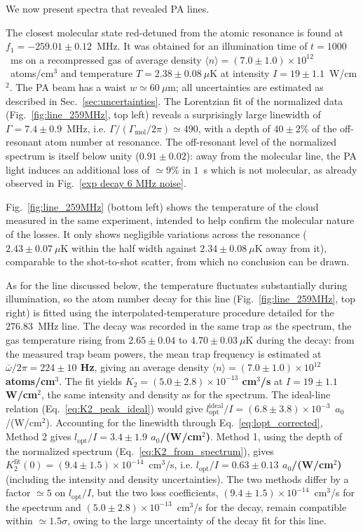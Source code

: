 We now present spectra that revealed PA lines.

The closest molecular state red-detuned from the atomic resonance is found at
$f_1 = -259.01 \pm 0.12$~MHz. It was obtained for an illumination time of
$t=1000$~ms on a recompressed gas of average density
$\langle n\rangle = (7.0\pm1.0)\times10^{12}$~atoms/cm$^3$ and temperature $T=2.38\pm0.08~\mu$K at intensity
$I=19\pm1.1$~W/cm$^2$. The PA beam has a waist $w\simeq60~\mu$m; all uncertainties are estimated as described in
Sec.~\ref{sec:uncertainties}. The
Lorentzian fit of the normalized data (Fig.~\ref{fig:line_259MHz}, top left) reveals a
surprisingly large linewidth of $\Gamma = 7.4\pm0.9$~MHz, i.e.
$\Gamma/(\Gamma_{\text{mol}}/2\pi) \simeq 490$, with a depth of
$40\pm2\%$ of the off-resonant atom number at resonance. The off-resonant level of the
normalized spectrum is itself below unity ($0.91\pm0.02$): away from the molecular line,
the PA light induces an additional loss of $\simeq9\%$ in $1$~s which is not molecular, as
already observed in Fig.~\ref{exp decay 6 MHz noise}.

Fig.~\ref{fig:line_259MHz} (bottom left) shows the temperature of the cloud measured in the
same experiment, intended to help confirm the molecular nature of the losses. It only
shows negligible variations across the resonance ($2.43\pm0.07~\mu$K within the half width
against $2.34\pm0.08~\mu$K away from it), comparable to the shot-to-shot scatter, from
which no conclusion can be drawn.

As for the line discussed below, the temperature fluctuates substantially during
illumination, so the atom number decay for this line
(Fig.~\ref{fig:line_259MHz}, top right) is fitted using the interpolated-temperature
procedure detailed for the $276.83$~MHz line. The decay was recorded in the same
trap as the spectrum, the gas temperature rising from $2.65\pm0.04$ to $4.70\pm0.03~\mu$K during the decay:
from the measured trap beam powers, the mean trap frequency is
estimated at \textbf{$\bar\omega/2\pi = 224\pm10$ Hz}, giving an average density
\textbf{$\langle n\rangle = (7.0\pm1.0)\times10^{12}$ atoms/cm$^3$}.
The fit yields \textbf{$K_2 = (5.0\pm2.8)\times10^{-13}$ cm$^3$/s} at
\textbf{$I=19\pm1.1$ W/cm$^2$}, the same intensity and density as for the spectrum. The
ideal-line relation (Eq.~\ref{eq:K2_peak_ideal}) would give
$l_{\text{opt}}^{\text{ideal}}/I=(6.8\pm3.8)\times10^{-3}$~$a_0$/(W/cm$^2$).
Accounting for the linewidth through Eq.~\ref{eq:lopt_corrected}, Method 2 gives
\textbf{$l_{\text{opt}}/I=3.4\pm1.9$ $a_0$/(W/cm$^2$)}. Method 1, using the depth
of the normalized spectrum (Eq.~\ref{eq:K2_from_spectrum}), gives
$K_2^{\text{fit}}(0) = (9.4\pm1.5)\times10^{-14}$~cm$^3$/s, i.e.
\textbf{$l_{\text{opt}}/I=0.63\pm0.13$ $a_0$/(W/cm$^2$)} (including the intensity and
density uncertainties). The two methods differ by a factor $\simeq5$ on $l_{\text{opt}}/I$, but the two loss
coefficients, $(9.4\pm1.5)\times10^{-14}$~cm$^3$/s for the spectrum and
$(5.0\pm2.8)\times10^{-13}$~cm$^3$/s for the decay, remain compatible within $\simeq1.5\sigma$,
owing to the large uncertainty of the decay fit for this line.

